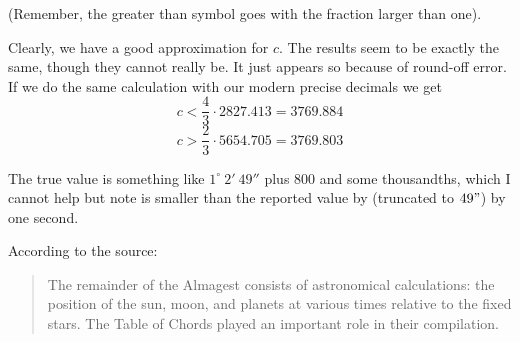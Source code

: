 \documentclass[11pt, oneside]{article}
\begin{document}
(Remember, the greater than symbol goes with the fraction larger than one).

Clearly, we have a good approximation for $c$.  The results seem to be exactly the same, though they cannot really be.  It just appears so because of round-off error.  If we do the same calculation with our modern precise decimals we get
\[ c < \frac{4}{3} \cdot 2827.413 = 3769.884 \]
\[ c > \frac{2}{3} \cdot 5654.705 = 3769.803 \]

The true value is something like $1^{\circ}\ 2'\ 49''$ plus $800$ and some thousandths, which I cannot help but note is smaller than the reported value by (truncated to $49"$) by one second.

According to the source:

\begin{quote}The remainder of the Almagest consists of astronomical calculations: the position of the sun, moon, and planets at various times relative to the fixed stars. The Table of Chords played an important role in their compilation.\end{quote}
\end{document}
